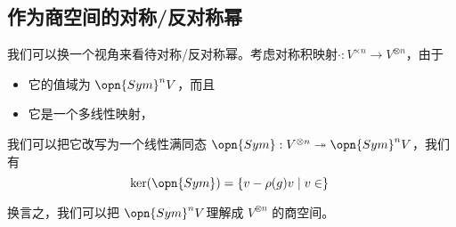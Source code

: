 \subsection{作为商空间的对称/反对称幂}

我们可以换一个视角来看待对称/反对称幂。考虑对称积映射$\cdot: V^{\times n} \to V^{\otimes n}$，由于
\begin{itemize}
\item 它的值域为 $\opn{Sym}^n V$，而且
\item 它是一个多线性映射，
\end{itemize}
我们可以把它改写为一个线性满同态 $\opn{Sym}: V^{\otimes n} \twoheadrightarrow \opn{Sym}^n V$，我们有
\begin{equation}
\ker(\opn{Sym}) = \{v - \rho(g) v \mid v \in \}~
\end{equation}



换言之，我们可以把 $\opn{Sym}^n V$理解成 $V^{\otimes n}$ 的商空间。

